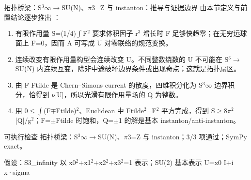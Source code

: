 \begin{frame}[t]{拓扑桥梁：S\ensuremath{^{3}}\ensuremath{\infty}\ensuremath{\rightarrow}SU(N)、\ensuremath{\pi}3=Z 与 instanton：推导与证据边界}
\footnotesize
{}\quad 由本节定义与前置结论逐步推出 ：
\begin{enumerate}
\item 有限作用量 S=(1/\allowbreak{}4)\ensuremath{\int}F\ensuremath{^{2}} 要求体积因子 r\ensuremath{^{3}} 增长时 F 足够快趋零；在无穷远球面上 F=0，因而 A 可写成 U 对零联络的规范变换。
\item 连续改变有限作用量构型会连续改变 U。不同整数绕数的 U 不可能在 S\ensuremath{^{3}}\ensuremath{\rightarrow}SU(N) 内连续互变，除非中途破坏边界条件或出现奇点；这就是拓扑扇区。
\item 由 F Ftilde 是 Chern--Simons current 的散度，四维积分化为 S\ensuremath{^{3}}\ensuremath{\infty} 边界积分，恰得到 \ensuremath{\nu}[U]，所以光滑有限作用量场的 Q 为整数。
\item 用 0\ensuremath{\le}\ensuremath{\int}(F\ensuremath{\mp}Ftilde)\ensuremath{^{2}}、Euclidean 中 Ftilde\ensuremath{^{2}}=F\ensuremath{^{2}} 平方完成，得到 S\ensuremath{\ge}8\ensuremath{\pi}\ensuremath{^{2}}|Q|/\allowbreak{}g\ensuremath{^{2}}；F=\ensuremath{\pm}Ftilde 时饱和，Q=\ensuremath{\pm}1 的解是基本 instanton/\allowbreak{}anti-instanton。
\end{enumerate}\begin{block}{可执行检查}
\quad 拓扑桥梁：S\ensuremath{^{3}}\ensuremath{\infty}\ensuremath{\rightarrow}SU(N)、\ensuremath{\pi}3=Z 与 instanton；3/3 项通过；SymPy exact。
\par\scriptsize 假设：S3\_infinity 以 x0\ensuremath{^{2}}+x1\ensuremath{^{2}}+x2\ensuremath{^{2}}+x3\ensuremath{^{2}}=1 表示；SU(2) 基本表示 U=x0 I+i x·sigma
\end{block}
\end{frame}

